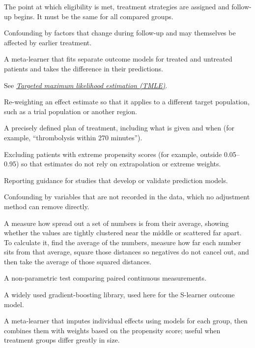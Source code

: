 \begin{description}[style=nextline, leftmargin=1.2em, itemsep=3pt, font=\normalfont\bfseries]
\item[Time zero]
The point at which eligibility is met, treatment strategies are assigned and follow-up begins. It must be the same for all compared groups.

\item[Time-varying confounding]
Confounding by factors that change during follow-up and may themselves be affected by earlier treatment.

\item[T-learner (two learner)]
A meta-learner that fits separate outcome models for treated and untreated patients and takes the difference in their predictions.

\item[TMLE]
See \emph{\hyperref[gl:tmle]{Targeted maximum likelihood estimation (TMLE)}}.

\item[Transportability]
Re-weighting an effect estimate so that it applies to a different target population, such as a trial population or another region.

\item[Treatment strategy]
A precisely defined plan of treatment, including what is given and when (for example, ``thrombolysis within 270 minutes'').

\item[Trimming]
Excluding patients with extreme propensity scores (for example, outside 0.05--0.95) so that estimates do not rely on extrapolation or extreme weights.

\item[TRIPOD]
Reporting guidance for studies that develop or validate prediction models.

\item[Unmeasured confounding]
Confounding by variables that are not recorded in the data, which no adjustment method can remove directly.

\item[Variance]
A measure how spread out a set of numbers is from their average, showing whether the values are tightly clustered near the middle or scattered far apart. To calculate it, find the average of the numbers, measure how far each number sits from that average, square those distances so negatives do not cancel out, and then take the average of those squared distances.

\item[Wilcoxon signed-rank test]
A non-parametric test comparing paired continuous measurements.

\item[XGBoost]
A widely used gradient-boosting library, used here for the S-learner outcome model.

\item[X-learner]
A meta-learner that imputes individual effects using models for each group, then combines them with weights based on the propensity score; useful when treatment groups differ greatly in size.

\end{description}
